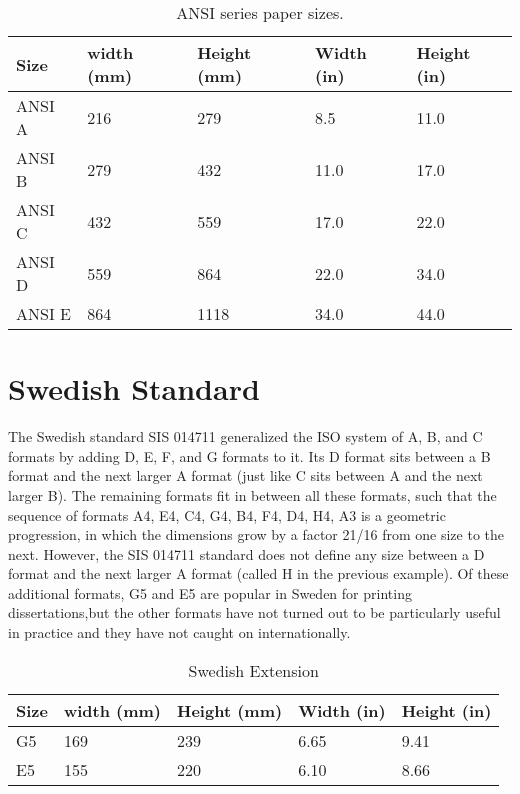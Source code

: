 \documentclass[a5paper]{scrbook}
\begin{document}
\begin{table}[ht]
\caption{ANSI series paper sizes.}
\begin{tabular}{lllll}
\toprule
Size &width (mm)  &Height (mm)  &Width (in) &Height (in)\\
\midrule
ANSI A &216 &279 &8.5 &11.0\\
ANSI B &279 &432 &11.0 &17.0\\
ANSI C &432 &559 &17.0 &22.0\\
ANSI D &559 &864 &22.0 &34.0\\
ANSI E &864 &1118 &34.0 &44.0\\

\bottomrule
\end{tabular}
\end{table}

\clearpage

\section{Swedish Standard}
The Swedish standard SIS 014711 generalized the ISO system of A, B, and C formats by adding D, E, F, and G formats to it. Its D format sits between a B format and the next larger A format (just like C sits between A and the next larger B). The remaining formats fit in between all these formats, such that the sequence of formats A4, E4, C4, G4, B4, F4, D4, H4, A3 is a geometric progression, in which the dimensions grow by a factor 21/16 from one size to the next. However, the SIS 014711 standard does not define any size between a D format and the next larger A format (called H in the previous example). Of these additional formats, G5 and E5 are popular in Sweden for printing dissertations,but the other formats have not turned out to be particularly useful in practice and they have not caught on internationally.

\begin{table}[ht]
\caption{Swedish Extension}
\begin{tabular}{lllll}
\toprule
Size &width (mm)  &Height (mm)  &Width (in) &Height (in)\\
\midrule
G5 &169 &239 &6.65 &9.41\\
E5  &155 &220 &6.10 &8.66\\

\bottomrule
\end{tabular}
\end{table}

\lipsum
\end{document}
